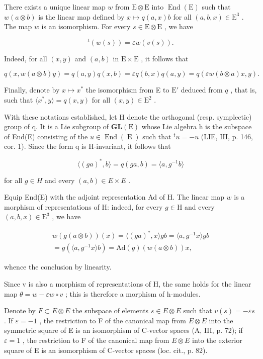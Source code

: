 There exists a unique linear map \(w\) from \(\mathrm{E} \otimes \mathrm{E}\) into \(\operatorname{End}(\mathrm{E})\) such that \(w(a \otimes b)\) is the linear map defined by \(x \mapsto q(a, x)b\) for all \((a, b, x) \in \mathrm{E}^3\) . The map \(w\) is an isomorphism. For every \(s \in \mathrm{E} \otimes \mathrm{E}\) , we have

\[
{ } ^ { t } ( w ( s ) ) = \varepsilon w ( v ( s ) ) .\tag{3}
\]

Indeed, for all \((x,y)\) and \((a,b)\) in \(\mathrm{E} \times \mathrm{E}\) , it follows that

\[
q (x, w (a \otimes b) y) = q (a, y) q (x, b) = \varepsilon q (b, x) q (a, y) = q (\varepsilon w (b \otimes a) x, y).
\]

Finally, denote by \(x \mapsto x^*\) the isomorphism from E to \(\mathrm{E}'\) deduced from \(q\) , that is, such that \(\langle x^*, y \rangle = q(x, y)\) for all \((x, y) \in \mathrm{E}^2\) .

With these notations established, let H denote the orthogonal (resp. symplectic) group of q. It is a Lie subgroup of \(\mathbf{GL}(\mathrm{E})\) whose Lie algebra h is the subspace of End(E) consisting of the \(u \in \operatorname{End}(\operatorname{E})\) such that \(^{t}u = -u\) (LIE, III, p. 146, cor. 1). Since the form q is H-invariant, it follows that

\[
\langle (g a) ^ {*}, b \rangle = q (g a, b) = \langle a, g ^ {- 1} b \rangle
\]

for all \(g \in H\) and every \((a, b) \in E \times E\) .

Equip End(E) with the adjoint representation Ad of H. The linear map \(w\) is a morphism of representations of H: indeed, for every \(g \in \mathrm{H}\) and every \((a, b, x) \in \mathrm{E}^3\) , we have

\[
\begin{array}{c} w (g   (a \otimes b)) (x) = \langle (g a) ^ {*}, x \rangle   g b = \langle a, g ^ {- 1} x \rangle   g b \\ = g   (\langle a, g ^ {- 1} x \rangle   b) = \mathrm{Ad} (g) (w (a \otimes b)) x, \end{array}
\]

whence the conclusion by linearity.

Since v is also a morphism of representations of H, the same holds for the linear map \(\theta = w - \varepsilon w \circ v\) ; this is therefore a morphism of h-modules.

Denote by \(F \subset E \otimes E\) the subspace of elements \(s \in E \otimes E\) such that \(v(s) = -\varepsilon s\) . If \(\varepsilon = -1\) , the restriction to F of the canonical map from \(E \otimes E\) into the symmetric square of E is an isomorphism of C-vector spaces (A, III, p. 72); if \(\varepsilon = 1\) , the restriction to F of the canonical map from \(E \otimes E\) into the exterior square of E is an isomorphism of C-vector spaces (loc. cit., p. 82).

